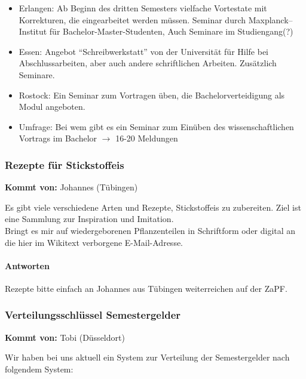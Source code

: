 \begin{itemize}
          \item Erlangen: Ab Beginn des dritten Semesters vielfache Vortestate mit Korrekturen, die eingearbeitet werden müssen. Seminar durch Maxplanck–Institut für Bachelor-Master-Studenten, Auch Seminare im Studiengang(?)
          \item Essen: Angebot “Schreibwerkstatt” von der Universität für Hilfe bei Abschlussarbeiten, aber auch andere schriftlichen Arbeiten. Zusätzlich Seminare.
          \item Rostock: Ein Seminar zum Vortragen üben, die Bachelorverteidigung als Modul angeboten.
          \item Umfrage: Bei wem gibt es ein Seminar zum Einüben des wissenschaftlichen Vortrags im Bachelor $\rightarrow$ 16-20 Meldungen
        \end{itemize}

    \subsubsection*{Rezepte für Stickstoffeis}
      \textbf{Kommt von:} Johannes (Tübingen)

      Es gibt viele verschiedene Arten und Rezepte, Stickstoffeis zu zubereiten.
      Ziel ist eine Sammlung zur Inspiration und Imitation. \\

      Bringt es mir auf wiedergeborenen Pflanzenteilen in Schriftform
      oder digital an die hier im Wikitext verborgene E-Mail-Adresse.

      \paragraph{Antworten}
        Rezepte bitte einfach an Johannes aus Tübingen weiterreichen auf der ZaPF.

    \subsubsection*{Verteilungsschlüssel Semestergelder}
      \textbf{Kommt von:} Tobi (Düsseldort)

      Wir haben bei uns aktuell ein System zur Verteilung der Semestergelder nach folgendem System: \\

